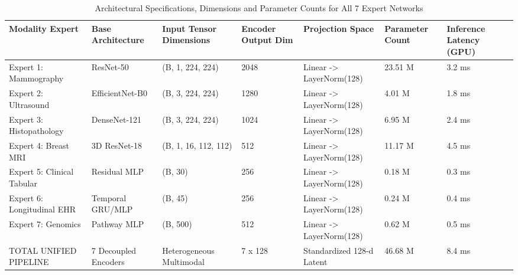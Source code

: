 \begin{table}
\caption{Architectural Specifications, Dimensions and Parameter Counts for All 7 Expert Networks}
\label{tab:table_6_01_05_seven_expert_encoder_architectural_specifications}
\begin{tabular}{lllllll}
\toprule
Modality Expert & Base Architecture & Input Tensor Dimensions & Encoder Output Dim & Projection Space & Parameter Count & Inference Latency (GPU) \\
\midrule
Expert 1: Mammography & ResNet-50 & (B, 1, 224, 224) & 2048 & Linear -> LayerNorm(128) & 23.51 M & 3.2 ms \\
Expert 2: Ultrasound & EfficientNet-B0 & (B, 3, 224, 224) & 1280 & Linear -> LayerNorm(128) & 4.01 M & 1.8 ms \\
Expert 3: Histopathology & DenseNet-121 & (B, 3, 224, 224) & 1024 & Linear -> LayerNorm(128) & 6.95 M & 2.4 ms \\
Expert 4: Breast MRI & 3D ResNet-18 & (B, 1, 16, 112, 112) & 512 & Linear -> LayerNorm(128) & 11.17 M & 4.5 ms \\
Expert 5: Clinical Tabular & Residual MLP & (B, 30) & 256 & Linear -> LayerNorm(128) & 0.18 M & 0.3 ms \\
Expert 6: Longitudinal EHR & Temporal GRU/MLP & (B, 45) & 256 & Linear -> LayerNorm(128) & 0.24 M & 0.4 ms \\
Expert 7: Genomics & Pathway MLP & (B, 500) & 512 & Linear -> LayerNorm(128) & 0.62 M & 0.5 ms \\
TOTAL UNIFIED PIPELINE & 7 Decoupled Encoders & Heterogeneous Multimodal & 7 x 128 & Standardized 128-d Latent & 46.68 M & 8.4 ms \\
\bottomrule
\end{tabular}
\end{table}
